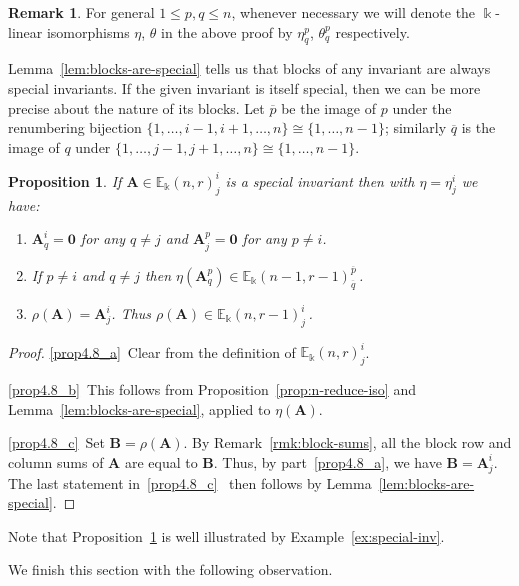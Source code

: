 \documentclass[10pt]{article}
\newtheorem{prop}[theorem]{Proposition}
\theoremstyle{definition}
\newtheorem{rema}[theorem]{Remark}
\newcommand{\E}{\mathbb{E}}
\newcommand{\ov}{\overline}
\newcommand{\bA}{\mathbf{A}}
\newcommand{\bB}{\mathbf{B}}
\newcommand{\bzero}{\mathbf{0}}
\begin{document}
\begin{rema}\label{rmk:eta-theta}
For general $1 \le p,q \le n$, whenever necessary we
will denote the $\Bbbk$-linear isomorphisms $\eta$, $\theta$ in the
above proof by $\eta^p_q$, $\theta^p_q$ respectively. 
\end{rema}

Lemma~\ref{lem:blocks-are-special} tells us that blocks of any
invariant are always special invariants. If the given invariant is
itself special, then we can be more precise about the nature of its
blocks. Let $\ov{p}$ be the image of $p$ under the renumbering
bijection $\{1, \dots, i-1, i+1, \dots, n\} \cong \{1, \dots, n-1\}$;
similarly $\ov{q}$ is the image of $q$ under $\{1, \dots, j-1, j+1,
\dots, n\} \cong \{1, \dots, n-1\}$.

\begin{prop}\label{prop:special-ext-form}
 If $\bA \in \E_\Bbbk(n,r)^i_j$ is a special invariant then with
 $\eta = \eta^i_j$ we have:
 \begin{enumerate}[label=(\alph*)]
 \item\label{prop4.8_a} $\bA^i_q = \bzero$ for any $q \ne j$ and $\bA^p_j = \bzero$ for
 any $p \ne i$.
 \item\label{prop4.8_b} If $p \ne i$ and $q \ne j$ then $\eta(\bA^p_q) \in
 \E_\Bbbk(n-1,r-1)^{\ov{p}}_{\ov{q}}$\,. 
 \item\label{prop4.8_c} $\rho(\bA) = \bA^i_j$. Thus $\rho(\bA) \in
 \E_\Bbbk(n,r-1)^i_j$\,.
 \end{enumerate}
\end{prop}

\begin{proof}
\ref{prop4.8_a}~Clear from the definition of $\E_\Bbbk(n,r)^i_j$.

\ref{prop4.8_b}~This follows from Proposition~\ref{prop:n-reduce-iso} and Lemma~\ref{lem:blocks-are-special}, applied to $\eta(\bA)$.

\ref{prop4.8_c}~Set $\bB = \rho(\bA)$. By Remark~\ref{rmk:block-sums}, all the
 block row and column sums of $\bA$ are equal to $\bB$. Thus, by part~\ref{prop4.8_a}, 
 we have $\bB = \bA^i_j$. The last statement in~\ref{prop4.8_c}~ then follows
 by Lemma~\ref{lem:blocks-are-special}.
\end{proof}

Note that Proposition~\ref{prop:special-ext-form} is well illustrated
by Example~\ref{ex:special-inv}.



We finish this section with the following observation. 
\end{document}
